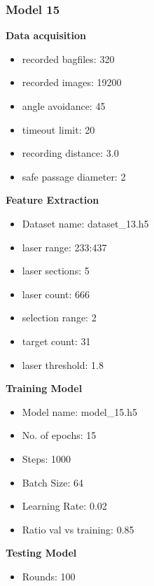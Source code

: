 \subsubsection{Model 15\label{model_15} }
\begin{multicols}{2}\textbf{Data acquisition}
\begin{itemize}
\setlength\itemsep{0.1em}
\item recorded bagfiles: 320
\item recorded images: 19200
\item angle avoidance: 45
\item timeout limit: 20
\item recording distance: 3.0
\item safe passage diameter: 2
\end{itemize}
\textbf{Feature Extraction}
\begin{itemize}
\setlength\itemsep{0.1em}
\item Dataset name: dataset\_13.h5
\item  laser range: 233:437
\item  laser sections: 5
\item  laser count: 666
\item  selection range: 2
\item  target count: 31
\item  laser threshold: 1.8
\end{itemize}
\textbf{Training Model}
\begin{itemize}
\setlength\itemsep{0.1em}
\item  Model name: model\_15.h5
\item  No. of epochs: 15
\item  Steps: 1000
\item  Batch Size: 64
\item  Learning Rate: 0.02
\item  Ratio val vs training: 0.85
\end{itemize}
\textbf{Testing Model}
\begin{itemize}
\setlength\itemsep{0.1em}
\item Rounds: 100
\newline
\newline
\newline
\newline
\newline
\newline
\newline
\newline
\end{itemize}

\end{multicols}
